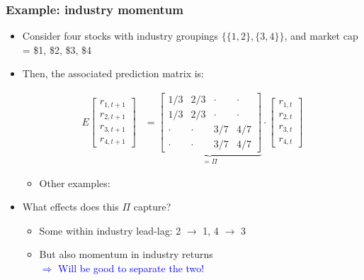 \documentclass[10pt]{beamer}
\begin{document}
\begin{frame}[label=Pi_industry]
\frametitle{Example: industry momentum}
\begin{itemize}
\item Consider four stocks with industry groupings $\{\{1,2\},\{3,4\}\}$, and market cap = \$1, \$2, \$3, \$4
\vspace{10pt}
\item Then, the associated prediction matrix is:

\begin{align*}
E\begin{bmatrix} r_{1,t+1} \\ r_{2,t+1} \\ r_{3,t+1} \\ r_{4,t+1} \end{bmatrix} & = \underbrace{\begin{bmatrix} 1/3 & 2/3 & \cdot & \cdot \\
1/3 & 2/3 & \cdot & \cdot \\ 
\cdot & \cdot & 3/7& 4/7 \\
\cdot & \cdot & 3/7& 4/7
\end{bmatrix}}_{=\Pi} \cdot \begin{bmatrix} r_{1,t} \\ r_{2,t} \\ r_{3,t} \\ r_{4,t} \end{bmatrix}
\end{align*}
\begin{itemize}
\item Other examples: \hyperlink{Pi_tech}{} ~ \hyperlink{Pi_econ}{}
\end{itemize}

\vspace{5pt}
\item What effects does this $\Pi$ capture?
\begin{itemize}
    \item Some within industry lead-lag: 2 $\rightarrow$ 1, 4 $\rightarrow$ 3
    \item But also momentum in industry returns \\
    \textcolor{blue}{$\Rightarrow$ Will be good to separate the two!}
\end{itemize}
\end{itemize}
\end{frame}
\end{document}

